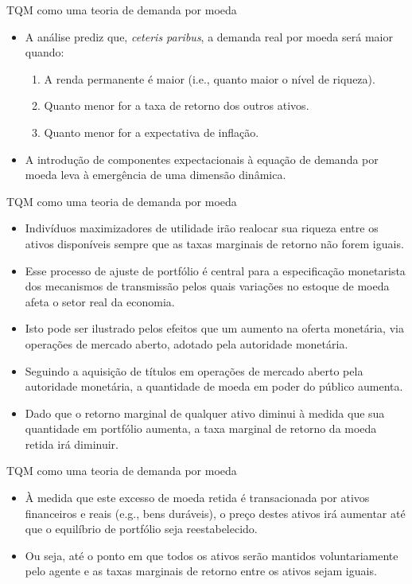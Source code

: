 \documentclass[10pt]{beamer}
\begin{document}
\begin{frame}{TQM como uma teoria de demanda por moeda}
    \begin{itemize}
        \item A análise prediz que, \emph{ceteris paribus}, a demanda real por moeda será maior quando:
        \bigskip
        \begin{enumerate}
            \item A renda permanente é maior (i.e., quanto maior o nível de riqueza).
            \bigskip
            \item Quanto menor for a taxa de  retorno dos outros ativos.
            \bigskip
            \item Quanto menor for a expectativa de inflação.
        \end{enumerate}
        \bigskip
        \item A introdução de componentes expectacionais à equação de demanda por moeda leva à emergência de uma dimensão dinâmica.
    \end{itemize}
\end{frame}

\begin{frame}{TQM como uma teoria de demanda por moeda}
    \begin{itemize}
        \item Indivíduos maximizadores de utilidade irão realocar sua riqueza entre os ativos disponíveis sempre que as taxas marginais de retorno não forem iguais.
        \bigskip
        \item Esse processo de ajuste de portfólio é central para a especificação monetarista dos mecanismos de transmissão pelos quais variações no estoque de moeda afeta o setor real da economia.
        \bigskip
        \item Isto pode ser ilustrado pelos efeitos que um aumento na oferta monetária, via operações de mercado aberto, adotado pela autoridade monetária.
        \bigskip
        \item Seguindo a aquisição de títulos em operações de mercado aberto pela autoridade monetária, a quantidade de moeda em poder do público aumenta.
        \bigskip
        \item Dado que o retorno marginal de qualquer ativo diminui à medida que sua quantidade em portfólio aumenta, a taxa marginal de retorno da moeda retida irá diminuir.
    \end{itemize}
\end{frame}

\begin{frame}{TQM como uma teoria de demanda por moeda}
    \begin{itemize}
        \item À medida que este excesso de moeda retida é transacionada por ativos financeiros e reais (e.g., bens duráveis), o preço destes ativos irá aumentar até que o equilíbrio de portfólio seja reestabelecido.
        \bigskip
        \item Ou seja, até o ponto em que todos os ativos serão mantidos voluntariamente pelo agente e as taxas marginais de retorno entre os ativos sejam iguais.
    \end{itemize}
\end{frame}
\end{document}
